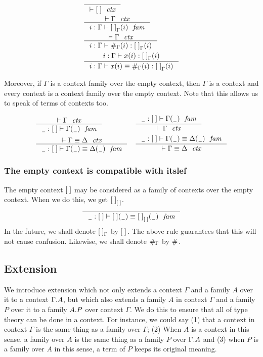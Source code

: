 \begin{align}
& \inference
  {}
  {\jctx{\emptyc}}\\
& \inference
  {\jctx{\Gamma}}
  {\jvfam{i}{\Gamma}{\emptyf[\Gamma]}}\\
& \inference
  {\jctx{\Gamma}}
  {\jvterm{i}{\Gamma}{\emptyf[\Gamma]}{\emptytm[\Gamma]}}\\
& \inference
  {\jvterm{i}{\Gamma}{\emptyf[\Gamma]}{x}}
  {\jvtermeq{i}{\Gamma}{\emptyf[\Gamma]}{x}{\emptytm[\Gamma]}}
\end{align}

Moreover, if $\Gamma$ is a context family over the
empty context, then $\Gamma$ is a context and every context is a context
family over the empty context. Note that this allows us to speak
of terms of contexts too.

\begin{align}
& \inference
  {\jctx{\Gamma}}
  {\jvfam{\nameless}{\emptyc}{\Gamma}} 
& & \inference
    {\jvfam{\nameless}{\emptyc}{\Gamma}}
    {\jctx{\Gamma}}\\
& \inference
  {\jctxeq{\Gamma}{\Delta}}
  {\jvfameq{\nameless}{\emptyc}{\Gamma}{\Delta}}
& & \inference
    {\jvfameq{\nameless}{\emptyc}{\Gamma}{\Delta}}
    {\jctxeq{\Gamma}{\Delta}}
\end{align}

\subsubsection{The empty context is compatible with itslef}
The empty context $\emptyc$ may be considered as a family of contexts over the empty
context. When we do this, we get $\emptyf[\emptyc]$.
\begin{equation}
\inference
  {}
  {\jvfameq{\nameless}{\emptyc}{\emptyc}{\emptyf[\emptyc]}}
\end{equation}
In the future, we shall denote $\emptyf[\Gamma]$ by $\emptyf$. The above rule
guarantees that this will not cause confusion. Likewise, we shall denote
$\emptytm[\Gamma]$ by $\emptytm$.

\subsection{Extension}
We introduce extension which not only extends a context $\Gamma$ and a family
$A$ over it to a context $\ctxext{\Gamma}{A}$, but which also extends a family $A$
in context $\Gamma$ and a family $P$ over it to a family $\ctxext{A}{P}$ over context
$\Gamma$. We do this to ensure that all of type theory can be done in a context.
For instance, we could say (1) that a context in context $\Gamma$ is the same thing
as a family over $\Gamma$; (2) When $A$ is a context in this sense, a family over
$A$ is the same thing as a family $P$ over $\ctxext{\Gamma}{A}$ and 
(3) when $P$ is a family over $A$ in this sense, a term of $P$ keeps its original meaning.

